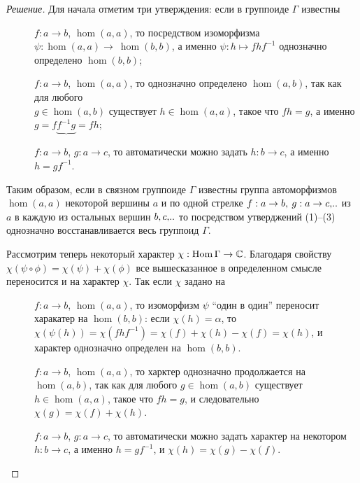 \begin{proof}[Решение] Для начала отметим три утверждения: если в группоиде 
    $\Gamma$ известны
    \begin{description}
        \item[] $f: a \to b$, $\hom(a,a)$, то посредством 
        изоморфизма $\psi : \hom(a,a) \to~\hom(b,b)$, а именно $\psi: h \mapsto 
        fhf^{-1}$ однозначно определено $\hom(b,b)$;
        \item[] $f: a \to b$, $\hom(a,a)$, то однозначно 
        определено $\hom(a,b)$, так как для любого \\$g \in \hom(a,b)$ существует 
        $h \in \hom(a,a)$, такое что $fh = g$, а именно \\$g = 
        f\underbrace{f^{-1}g} = fh$;
        \item[] $f: a \to b$, $g: a \to c$, то автоматически 
        можно задать $h: b \to c$, а именно $h = gf^{-1}$.
    \end{description}

    Таким образом, если в связном группоиде $\Gamma$ известны группа автоморфизмов 
    $\hom(a,a)$ некоторой вершины $a$ и по одной стрелке $f: a \to b,\: 
    g: a \to c,\!..$ из $a$ в каждую из остальных вершин $b,c,\!..$ то 
    посредством утверджений (1)--(3) однозначно восстанавливается весь группоид 
    $\Gamma$.

    Рассмотрим теперь некоторый характер $\chi: \operatorname*{Hom} \Gamma \to \mathbb{C}$.
    Благодаря свойству $\chi(\psi \circ \phi) = \chi(\psi) + \chi(\phi)$ все 
    вышесказанное в определенном смысле переносится и на характер $\chi$. Так 
    если $\chi$ задано на 
    \begin{description}
        \item[] $f: a \to b$, $\hom(a,a)$, то изоморфизм $\psi$ 
        ``один в один'' переносит харакатер на $\hom (b,b)$: если 
        $\chi(h) = \alpha$, то $\chi(\psi(h)) = \chi(fhf^{-1}) = \chi(f) + 
        \chi(h) - \chi(f) = \chi(h)$, и характер однозначно определен на 
        $\hom(b,b)$.
        \item[] $f: a \to b$, $\hom(a,a)$, то харктер однозначно 
        продолжается на $\hom(a,b)$, так как для любого $g \in \hom(a,b)$ существует 
        $h \in \hom(a,a)$, такое что $fh = g$, и следовательно $\chi(g) = 
        \chi(f) + \chi(h)$.
        \item[] $f: a \to b$, $g: a \to c$, то автоматически 
        можно задать характер на некотором $h: b \to c$, а именно $h = gf^{-1}$, 
        и $\chi(h) = \chi(g) - \chi(f)$.
    \end{description}


\end{proof}
